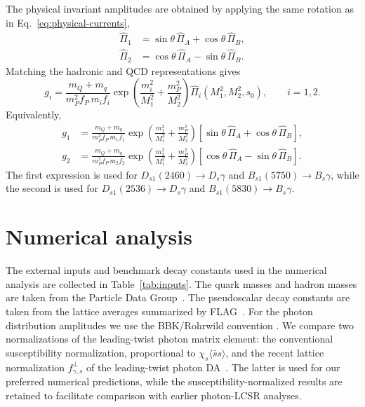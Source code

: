 \documentclass[aps,prd,preprint,nofootinbib,superscriptaddress]{revtex4-2}
\newcommand{\Ds}{D_s}
\newcommand{\Dsone}{D_{s1}}
\newcommand{\Bs}{B_s}
\newcommand{\Bsone}{B_{s1}}
\begin{document}
The physical invariant amplitudes are obtained by applying the same rotation
as in Eq.~\eqref{eq:physical-currents},
\begin{align}
  \widehat\Pi_1
  &=
  \sin\theta\,\widehat\Pi_A
  +\cos\theta\,\widehat\Pi_B ,
  \label{eq:pi1-rotation}\\
  \widehat\Pi_2
  &=
  \cos\theta\,\widehat\Pi_A
  -\sin\theta\,\widehat\Pi_B .
  \label{eq:pi2-rotation}
\end{align}
Matching the hadronic and QCD representations gives
\begin{equation}
  g_i =
  \frac{m_Q+m_q}{m_P^2 f_P\,m_i f_i}
  \exp\left(
  \frac{m_i^2}{M_1^2}
  +\frac{m_P^2}{M_2^2}
  \right)
  \widehat\Pi_i(M_1^2,M_2^2,s_0),
  \qquad i=1,2 .
  \label{eq:general-sum-rule}
\end{equation}
Equivalently,
\begin{align}
  g_1 &=
  \frac{m_Q+m_q}{m_P^2 f_P\,m_1 f_1}
  \exp\left(
  \frac{m_1^2}{M_1^2}
  +\frac{m_P^2}{M_2^2}
  \right)
  \left[
  \sin\theta\,\widehat\Pi_A
  +\cos\theta\,\widehat\Pi_B
  \right],
  \label{eq:g1-sum-rule}\\
  g_2 &=
  \frac{m_Q+m_q}{m_P^2 f_P\,m_2 f_2}
  \exp\left(
  \frac{m_2^2}{M_1^2}
  +\frac{m_P^2}{M_2^2}
  \right)
  \left[
  \cos\theta\,\widehat\Pi_A
  -\sin\theta\,\widehat\Pi_B
  \right].
  \label{eq:g2-sum-rule}
\end{align}
The first expression is used for
\(\Dsone(2460)\to\Ds\gamma\) and
\(\Bsone(5750)\to\Bs\gamma\), while the second is used for
\(\Dsone(2536)\to\Ds\gamma\) and
\(\Bsone(5830)\to\Bs\gamma\).

\section{Numerical analysis}
\label{sec:numerics}

The external inputs and benchmark decay constants used in the numerical
analysis are collected in Table~\ref{tab:inputs}.  The quark masses and hadron
masses are taken from the Particle Data Group~\cite{ParticleDataGroup:2024cfk}.
The pseudoscalar decay constants are taken from the lattice averages
summarized by FLAG~\cite{FlavourLatticeAveragingGroupFLAG:2024oxs}.  For the
photon distribution amplitudes we use the BBK/Rohrwild convention
\cite{Ball:2002ps,Rohrwild:2007yt}.  We compare two normalizations of the
leading-twist photon matrix element: the conventional susceptibility
normalization, proportional to $\chi_s\langle\bar s s\rangle$, and the recent
lattice normalization $f_{\gamma,s}^{\perp}$ of the leading-twist photon
DA~\cite{Bacchio:2024pij}.  The latter is used for our preferred numerical
predictions, while the susceptibility-normalized results are retained to
facilitate comparison with earlier photon-LCSR analyses.
\end{document}
